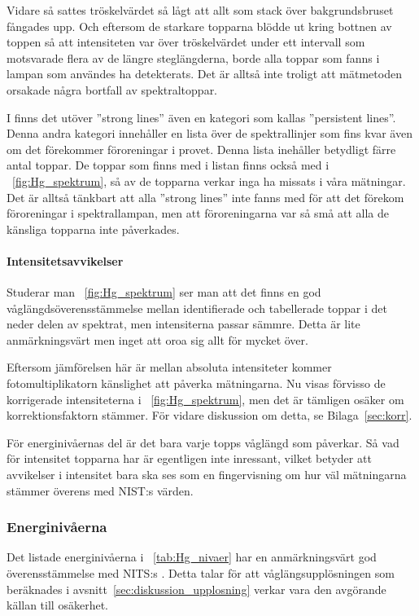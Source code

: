 \documentclass[11pt,a4paper]{article}
\newcommand{\figref}{\figurename~\ref}
\newcommand{\tabref}{\tablename~\ref} %
\begin{document}
Vidare så sattes tröskelvärdet så lågt att allt som stack över
bakgrundsbruset fångades upp. Och eftersom de starkare topparna blödde
ut kring bottnen av toppen så att intensiteten var över tröskelvärdet
under ett intervall som motsvarade flera av de längre steglängderna,
borde alla toppar som fanns i lampan som användes ha detekterats. Det
är alltså inte troligt att mätmetoden orsakade några bortfall av
spektraltoppar. 

I \cite{NIST_spectrum} finns det utöver ''strong lines'' även en
kategori som kallas ''persistent lines''. Denna andra kategori
innehåller en lista över de spektrallinjer som fins kvar även om det
förekommer föroreningar i provet. Denna lista inehåller betydligt
färre antal toppar. De toppar som finns med i listan\footnotemark{}
finns också med i \figref{fig:Hg_spektrum}, så av de topparna verkar
inga ha missats i våra mätningar. Det är alltså tänkbart att alla
''strong lines'' inte fanns med för att det förekom föroreningar i
spektrallampan, men att föroreningarna var så små att alla de känsliga
topparna inte påverkades. 


\paragraph{Intensitetsavvikelser}
Studerar man \figref{fig:Hg_spektrum} ser man att det finns en god
våglängdsöverensstämmelse mellan identifierade och tabellerade toppar
i det neder delen av spektrat, men intensiterna passar
sämmre. Detta är lite anmärkningsvärt men inget att oroa sig allt för
mycket över.

Eftersom jämförelsen här är mellan absoluta intensiteter kommer
fotomultiplikatorn känslighet att påverka mätningarna. Nu visas
förvisso de korrigerade intensiteterna i \figref{fig:Hg_spektrum}, men
det är tämligen osäker om korrektionsfaktorn stämmer. För vidare
diskussion om detta, se Bilaga~\ref{sec:korr}. 

För energinivåernas del är det bara varje topps våglängd som
påverkar. Så vad för intensitet topparna har är egentligen inte
inressant, vilket betyder att avvikelser i intensitet bara ska ses som
en fingervisning om hur väl mätningarna stämmer överens med
NIST:s \cite{NIST_spectrum} värden.

\subsubsection{Energinivåerna}\label{sec:diskussion_energi}
Det listade energinivåerna i \tabref{tab:Hg_nivaer} har en
anmärkningsvärt god överensstämmelse med NITS:s
\cite{NIST_levels}. Detta talar för att våglängsupplösningen som
beräknades i avsnitt~\ref{sec:diskussion_upplosning} verkar vara den
avgörande källan till osäkerhet. 
\end{document}
